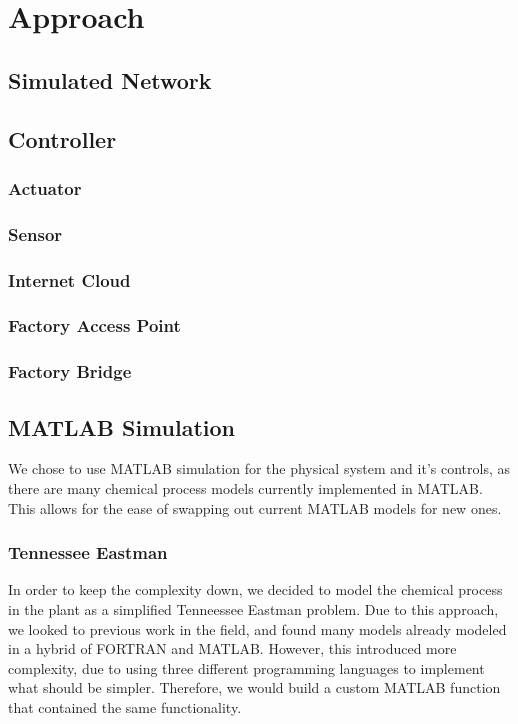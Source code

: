 \section{Approach}
\subsection{Simulated Network}

\subsection{Controller}

\subsubsection{Actuator}

\subsubsection{Sensor}

\subsubsection{Internet Cloud}

\subsubsection{Factory Access Point}

\subsubsection{Factory Bridge}

\subsection{MATLAB Simulation}
  We chose to use MATLAB simulation for the physical system and it's controls, 
  as there are many chemical process models currently implemented in MATLAB.
  This allows for the ease of swapping out current MATLAB models for new ones.

\subsubsection{Tennessee Eastman}
  In order to keep the complexity down, we decided to model the chemical process
  in the plant as a simplified Tenneessee Eastman problem. 
  Due to this approach, we looked to previous work in the field, and found many
  models already modeled in a hybrid of FORTRAN and MATLAB.  However, this 
  introduced more complexity, due to using three different programming languages
  to implement what should be simpler.  Therefore, we would build a custom
  MATLAB function that contained the same functionality.

